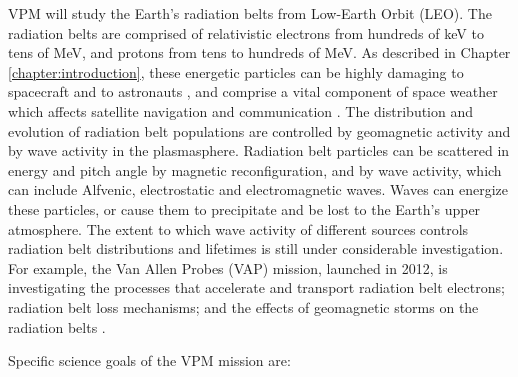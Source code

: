 VPM will study the Earth's radiation belts from Low-Earth Orbit (LEO). The radiation belts are comprised of relativistic electrons from hundreds of keV to tens of MeV, and protons from tens to hundreds of MeV. As described in Chapter \ref{chapter:introduction}, these energetic particles can be highly damaging to spacecraft and to astronauts \citep[e.g.][]{Barth2003}, and comprise a vital component of space weather which affects satellite navigation and communication \citep{Bothmer:2007}. The distribution and evolution of radiation belt populations are controlled by geomagnetic activity and by wave activity in the plasmasphere. Radiation belt particles can be scattered in energy and pitch angle by magnetic reconfiguration, and by wave activity, which can include Alfvenic, electrostatic and electromagnetic waves. Waves can energize these particles, or cause them to precipitate and be lost to the Earth's upper atmosphere. The extent to which wave activity of different sources controls radiation belt distributions and lifetimes is still under considerable investigation. For example, the Van Allen Probes (VAP) mission, launched in 2012, is investigating the processes that accelerate and transport radiation belt electrons; radiation belt loss mechanisms; and the effects of geomagnetic storms on the radiation belts \citep{Spence2014}. %

Specific science goals of the VPM mission are:

